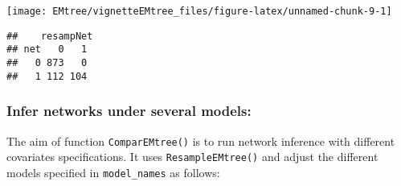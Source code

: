 \begin{Shaded}
\begin{Highlighting}[]
\OperatorTok{\$}\OperatorTok{/} 
\OperatorTok{*}\OperatorTok{>}\NormalTok{)}
\end{Highlighting}
\end{Shaded}

\begin{center}\texttt{[image: EMtree/vignetteEMtree\_files/figure-latex/unnamed-chunk-9-1]} \end{center}

\begin{Shaded}
\begin{Highlighting}[]
\end{Highlighting}
\end{Shaded}

\begin{verbatim}
##    resampNet
## net   0   1
##   0 873   0
##   1 112 104
\end{verbatim}

\subsubsection{Infer networks under several
models:}\label{infer-networks-under-several-models}

The aim of function \texttt{ComparEMtree()} is to run network inference
with different covariates specifications. It uses
\texttt{ResampleEMtree()} and adjust the different models specified in
\texttt{model\_names} as follows:

\begin{Shaded}
\begin{Highlighting}[]
\NormalTok{(}\NormalTok{,}\NormalTok{,}\NormalTok{(}\NormalTok{,}\NormalTok{))}
\NormalTok{(}\NormalTok{,}\NormalTok{,}\NormalTok{)}
\OperatorTok{/}\NormalTok{,  }\NormalTok{, }\NormalTok{,}\NormalTok{,}\NormalTok{)}
\end{Highlighting}
\end{Shaded}

